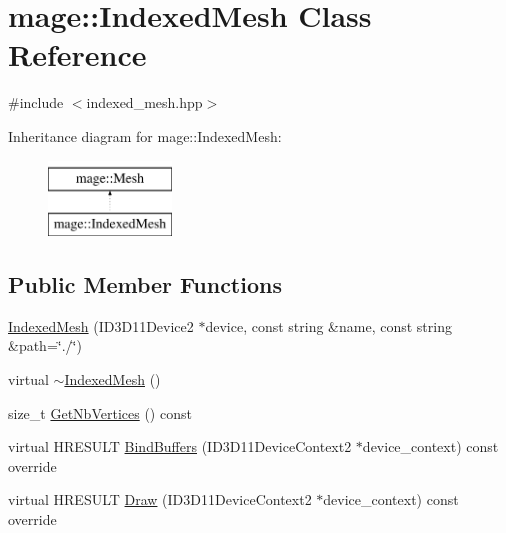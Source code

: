 \hypertarget{classmage_1_1_indexed_mesh}{}\section{mage\+:\+:Indexed\+Mesh Class Reference}
\label{classmage_1_1_indexed_mesh}


{\ttfamily \#include $<$indexed\+\_\+mesh.\+hpp$>$}

Inheritance diagram for mage\+:\+:Indexed\+Mesh\+:\begin{figure}[H]
\begin{center}
\leavevmode
\includegraphics[height=2.000000cm]{classmage_1_1_indexed_mesh}
\end{center}
\end{figure}
\subsection*{Public Member Functions}
\begin{DoxyCompactItemize}
\item 
\hyperlink{classmage_1_1_indexed_mesh_a2004ef3fd446e796cb908bfdd7e97896}{Indexed\+Mesh} (I\+D3\+D11\+Device2 $\ast$device, const string \&name, const string \&path=\char`\"{}./\char`\"{})
\item 
virtual \hyperlink{classmage_1_1_indexed_mesh_a4fccfbdca710d6588f4bc3fca837fd68}{$\sim$\+Indexed\+Mesh} ()
\item 
size\+\_\+t \hyperlink{classmage_1_1_indexed_mesh_ace923913f29e49a571c32b3fb76f6474}{Get\+Nb\+Vertices} () const
\item 
virtual H\+R\+E\+S\+U\+LT \hyperlink{classmage_1_1_indexed_mesh_aeef933509fe7f74a79efb8a1692fda1f}{Bind\+Buffers} (I\+D3\+D11\+Device\+Context2 $\ast$device\+\_\+context) const override
\item 
virtual H\+R\+E\+S\+U\+LT \hyperlink{classmage_1_1_indexed_mesh_a6d8543f09c82b4d7e85c68daf39945ce}{Draw} (I\+D3\+D11\+Device\+Context2 $\ast$device\+\_\+context) const override
\end{DoxyCompactItemize}
